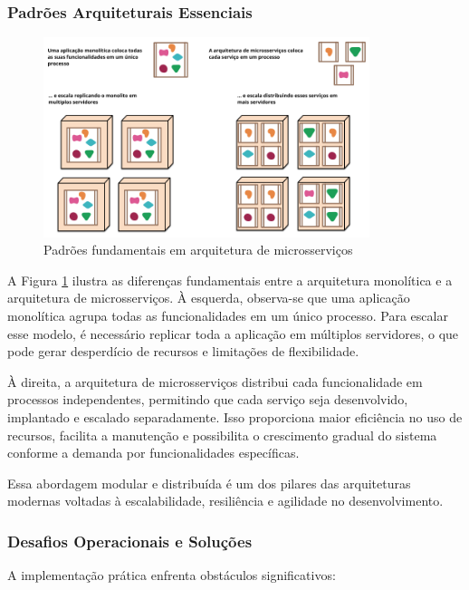 \subsubsection{Padrões Arquiteturais Essenciais}
\begin{figure}[H]
\centering
\includegraphics[width=0.85\textwidth]{images/microservice.png}
\caption{Padrões fundamentais em arquitetura de microsserviços}
\label{fig:micro_patterns}
\end{figure}

A Figura \ref{fig:micro_patterns} ilustra as diferenças fundamentais entre a arquitetura monolítica e a arquitetura de microsserviços. À esquerda, observa-se que uma aplicação monolítica agrupa todas as funcionalidades em um único processo. Para escalar esse modelo, é necessário replicar toda a aplicação em múltiplos servidores, o que pode gerar desperdício de recursos e limitações de flexibilidade.

À direita, a arquitetura de microsserviços distribui cada funcionalidade em processos independentes, permitindo que cada serviço seja desenvolvido, implantado e escalado separadamente. Isso proporciona maior eficiência no uso de recursos, facilita a manutenção e possibilita o crescimento gradual do sistema conforme a demanda por funcionalidades específicas.

Essa abordagem modular e distribuída é um dos pilares das arquiteturas modernas voltadas à escalabilidade, resiliência e agilidade no desenvolvimento.

\subsubsection{Desafios Operacionais e Soluções}
A implementação prática enfrenta obstáculos significativos:


